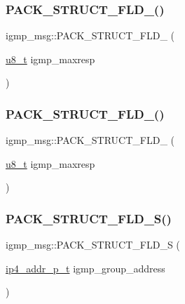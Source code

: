 \subsubsection{\texorpdfstring{P\+A\+C\+K\+\_\+\+S\+T\+R\+U\+C\+T\+\_\+\+F\+L\+D\+\_()}{PACK\_STRUCT\_FLD\_8()}\hspace{0.1cm}{\footnotesize\ttfamily [3/4]}}
{\footnotesize\ttfamily igmp\+\_\+msg\+::\+P\+A\+C\+K\+\_\+\+S\+T\+R\+U\+C\+T\+\_\+\+F\+L\+D\+\_ (\begin{DoxyParamCaption}\item[{\hyperlink{group__compiler__abstraction_ga4caecabca98b43919dd11be1c0d4cd8e}{u8\+\_\+t}}]{igmp\+\_\+maxresp }\end{DoxyParamCaption})}

\mbox{\label{structigmp__msg_a12565eb2acf6950ee18c368054fe0836}} 
\subsubsection{\texorpdfstring{P\+A\+C\+K\+\_\+\+S\+T\+R\+U\+C\+T\+\_\+\+F\+L\+D\+\_()}{PACK\_STRUCT\_FLD\_8()}\hspace{0.1cm}{\footnotesize\ttfamily [4/4]}}
{\footnotesize\ttfamily igmp\+\_\+msg\+::\+P\+A\+C\+K\+\_\+\+S\+T\+R\+U\+C\+T\+\_\+\+F\+L\+D\+\_ (\begin{DoxyParamCaption}\item[{\hyperlink{group__compiler__abstraction_ga4caecabca98b43919dd11be1c0d4cd8e}{u8\+\_\+t}}]{igmp\+\_\+maxresp }\end{DoxyParamCaption})}

\mbox{\label{structigmp__msg_a935034863490ec706ba33f238b77126a}} 
\subsubsection{\texorpdfstring{P\+A\+C\+K\+\_\+\+S\+T\+R\+U\+C\+T\+\_\+\+F\+L\+D\+\_\+\+S()}{PACK\_STRUCT\_FLD\_S()}\hspace{0.1cm}{\footnotesize\ttfamily [1/2]}}
{\footnotesize\ttfamily igmp\+\_\+msg\+::\+P\+A\+C\+K\+\_\+\+S\+T\+R\+U\+C\+T\+\_\+\+F\+L\+D\+\_\+S (\begin{DoxyParamCaption}\item[{\hyperlink{native_2lwip_2src_2include_2lwip_2prot_2ip4_8h_ae5011654fcbadf6b6582b8d49446107f}{ip4\+\_\+addr\+\_\+p\+\_\+t}}]{igmp\+\_\+group\+\_\+address }\end{DoxyParamCaption})}

